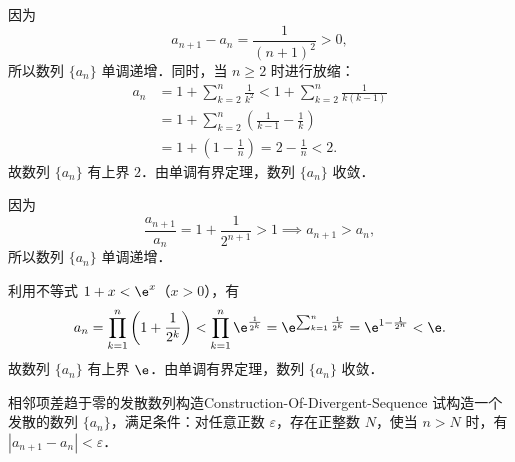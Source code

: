 \begin{myproof}

    因为
    \begin{equation}
        a_{n+1} - a_n = \frac{1}{(n+1)^2} > 0,
    \end{equation}
    所以数列 $\{a_n\}$ 单调递增．同时，当 $n \geqslant 2$ 时进行放缩：
    \begin{equation}
        \begin{aligned}
            a_n & = 1 + \sum_{k=2}^n \frac{1}{k^2} < 1 + \sum_{k=2}^n \frac{1}{k(k-1)} \\
                & = 1 + \sum_{k=2}^n \left( \frac{1}{k-1} - \frac{1}{k} \right)        \\
                & = 1 + \left( 1 - \frac{1}{n} \right) = 2 - \frac{1}{n} < 2.
        \end{aligned}
    \end{equation}
    故数列 $\{a_n\}$ 有上界 $2$．由单调有界定理，数列 $\{a_n\}$ 收敛．


    因为
    \begin{equation}
        \frac{a_{n+1}}{a_n} = 1 + \frac{1}{2^{n+1}} > 1 \implies a_{n+1} > a_n,
    \end{equation}
    所以数列 $\{a_n\}$ 单调递增．

    利用不等式 $1 + x < \e^x$（$x > 0$），有
    \begin{equation}
        a_n = \prod_{k=1}^n \left( 1 + \frac{1}{2^k} \right) < \prod_{k=1}^n \e^{\frac{1}{2^k}} = \e^{\sum_{k=1}^n \frac{1}{2^k}} = \e^{1 - \frac{1}{2^n}} < \e.
    \end{equation}
    故数列 $\{a_n\}$ 有上界 $\e$．由单调有界定理，数列 $\{a_n\}$ 收敛．
\end{myproof}

\begin{problem}{相邻项差趋于零的发散数列构造}{Construction-Of-Divergent-Sequence}
    试构造一个发散的数列 $\{a_n\}$，满足条件：对任意正数 $\varepsilon$，存在正整数 $N$，使当 $n > N$ 时，有 $|a_{n+1} - a_n| < \varepsilon$．
\end{problem}

